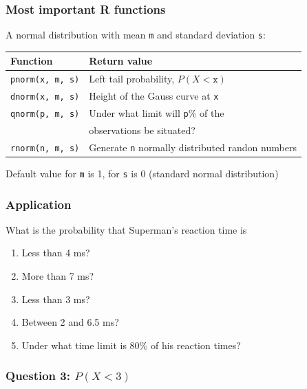 \documentclass{beamer}
\begin{document}
\begin{frame}[fragile]
  \frametitle{Most important R functions}
  
  A normal distribution with mean \texttt{m} and standard deviation \texttt{s}:
  \vfill
  \centering
  \begin{tabular}{ll}
  	\textbf{Function}     & \textbf{Return value}                       \\ \hline
  	\verb|pnorm(x, m, s)| & Left tail probability, $P(X<\mathtt{x})$         \\
  	\verb|dnorm(x, m, s)| & Height of the Gauss curve at \texttt{x} \\
  	\verb|qnorm(p, m, s)| & Under what limit will \texttt{p}\% of the   \\
  	                      & observations be situated?                        \\
  	\verb|rnorm(n, m, s)| & Generate \texttt{n} normally distributed randon numbers
  \end{tabular}
  \vfill
  Default value for \texttt{m} is 1, for \texttt{s} is 0 (standard normal distribution)
\end{frame}

\begin{frame}
  \frametitle{Application}

  What is the probability that Superman's reaction time is

  \begin{enumerate}
    \item Less than 4 ms?
    \item More than 7 ms?
    \item Less than 3 ms?
    \item Between 2 and 6.5 ms?
    \item Under what time limit is 80\% of his reaction times?
  \end{enumerate}
\end{frame}

\begin{frame}
  \frametitle{Question 3: $P(X<3)$}

\end{frame}
\end{document}

